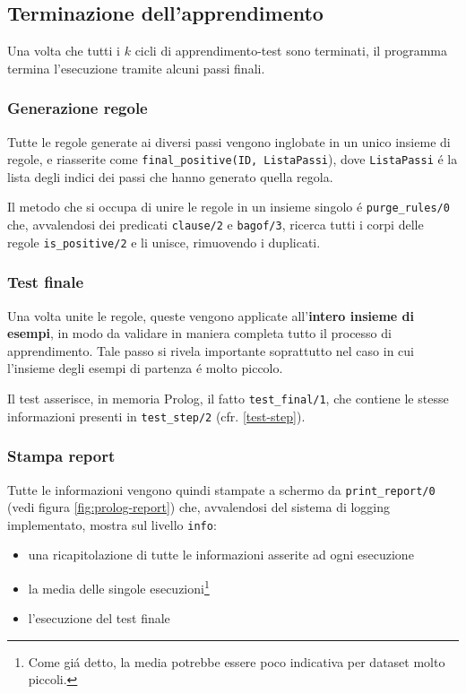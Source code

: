 \documentclass[preprint]{acm_proc_article-sp}
\begin{document}
\subsection{Terminazione dell'apprendimento}
Una volta che tutti i $k$ cicli di apprendimento-test sono terminati, il programma termina l'esecuzione tramite alcuni passi finali.

\subsubsection{Generazione regole}
\label{unione-regole}
Tutte le regole generate ai diversi passi vengono inglobate in un unico insieme di regole, e riasserite come \verb|final_positive(ID, ListaPassi|), dove \verb|ListaPassi| \'e la lista degli indici dei passi che hanno generato quella regola.

Il metodo che si occupa di unire le regole in un insieme singolo \'e \verb|purge_rules/0| che, avvalendosi dei predicati \verb|clause/2| e \verb|bagof/3|, ricerca tutti i corpi delle regole \verb|is_positive/2| e li unisce, rimuovendo i duplicati.

\subsubsection{Test finale}
Una volta unite le regole, queste vengono applicate all'\textbf{intero insieme di esempi}, in modo da validare in maniera completa tutto il processo di apprendimento. Tale passo si rivela importante soprattutto nel caso in cui l'insieme degli esempi di partenza \'e molto piccolo.

Il test asserisce, in memoria Prolog, il fatto \verb|test_final/1|, che contiene le stesse informazioni presenti in \verb|test_step/2| (cfr. \ref{test-step}).

\subsubsection{Stampa report}
Tutte le informazioni vengono quindi stampate a schermo da \verb|print_report/0| (vedi figura \ref{fig:prolog-report}) che, avvalendosi del sistema di logging implementato, mostra sul livello \verb|info|:
\begin{itemize}
\item una ricapitolazione di tutte le informazioni asserite ad ogni esecuzione
\item la media delle singole esecuzioni\footnote{Come gi\'a detto, la media potrebbe essere poco indicativa per dataset molto piccoli.}
\item l'esecuzione del test finale
\end{itemize}
\end{document}
